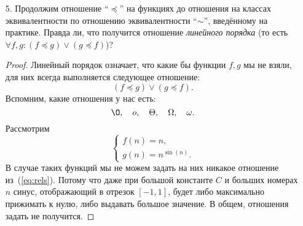 \begin{enumerate}
  \item[5.]
    Продолжим отношение ``$\preceq$'' на функциях до отношения на классах эквивалентности по отношению эквивалентности ``$\sim$'', введённому на практике. Правда ли, что получится отношение \textit{линейного порядка} (то есть
    $\forall f, g: (f \preceq g) \lor (g \preceq f)$)?
    \begin{proof}
      Линейный порядок означает, что какие бы функции $f, g$ мы не взяли, для них всегда выполняется следующее отношение:
      \begin{equation} \label{eq:rel}
        (f \preceq g) \lor (g \preceq f).
      \end{equation}
      Вспомним, какие отношения у нас есть:
      \begin{equation}\label{eq:rels}
        \O, \quad o, \quad \Theta, \quad \Omega, \quad \omega.
      \end{equation}
      Рассмотрим
      \begin{equation}
        \begin{cases}
          f(n) = n, \\
          g(n) = n^{\sin(n)}.
        \end{cases}
      \end{equation}
      В случае таких функций мы не можем задать на них никакое отношение из~(\ref{eq:rels}). Потому что даже при большой константе $C$ и больших номерах $n$ синус, отображающий в отрезок $[-1,1]$, будет либо максимально прижимать к нулю, либо выдавать большое значение. В общем, отношения задать не получится.
      
    \end{proof}


\end{enumerate}
